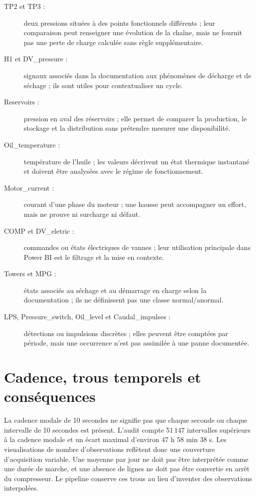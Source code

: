 \begin{description}
\item[TP2 et TP3 :] deux pressions situées à des points fonctionnels différents ; leur comparaison peut renseigner une évolution de la chaîne, mais ne fournit pas une perte de charge calculée sans règle supplémentaire.
\item[H1 et DV\_pressure :] signaux associés dans la documentation aux phénomènes de décharge et de séchage ; ils sont utiles pour contextualiser un cycle.
\item[Reservoirs :] pression en aval des réservoirs ; elle permet de comparer la production, le stockage et la distribution sans prétendre mesurer une disponibilité.
\item[Oil\_temperature :] température de l'huile ; les valeurs décrivent un état thermique instantané et doivent être analysées avec le régime de fonctionnement.
\item[Motor\_current :] courant d'une phase du moteur ; une hausse peut accompagner un effort, mais ne prouve ni surcharge ni défaut.
\item[COMP et DV\_eletric :] commandes ou états électriques de vannes ; leur utilisation principale dans Power BI est le filtrage et la mise en contexte.
\item[Towers et MPG :] états associés au séchage et au démarrage en charge selon la documentation ; ils ne définissent pas une classe normal/anormal.
\item[LPS, Pressure\_switch, Oil\_level et Caudal\_impulses :] détections ou impulsions discrètes ; elles peuvent être comptées par période, mais une occurrence n'est pas assimilée à une panne documentée.
\end{description}

\section{Cadence, trous temporels et conséquences}
La cadence modale de 10 secondes ne signifie pas que chaque seconde ou chaque intervalle de 10 secondes est présent. L'audit compte 51\,147 intervalles supérieurs à la cadence modale et un écart maximal d'environ 47 h 58 min 38 s. Les visualisations de nombre d'observations reflètent donc une couverture d'acquisition variable. Une moyenne par jour ne doit pas être interprétée comme une durée de marche, et une absence de lignes ne doit pas être convertie en arrêt du compresseur. Le pipeline conserve ces trous au lieu d'inventer des observations interpolées.

